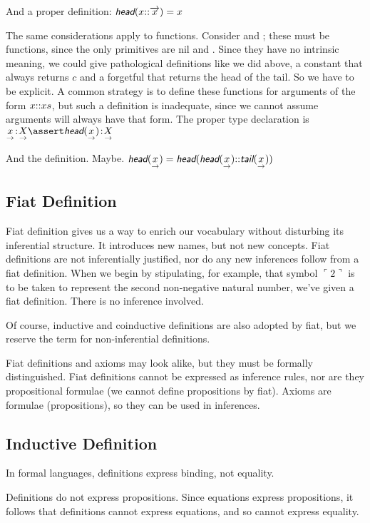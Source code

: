 \documentclass{article}
\begin{document}
And a proper definition: \(\head(x\cons\coseq{x}) = x\)

The same considerations apply to functions. Consider \head{} and
\tail{}; these must be functions, since the only primitives are nil
and \Cons. Since they have no intrinsic meaning, we could give
pathological definitions like we did above, a constant \head{} that
always returns \(c\) and a forgetful \head{} that returns the head of
the tail. So we have to be explicit. A common strategy is to define
these functions for arguments of the form \(x{\mathpunct{::}} xs\), but such a
definition is inadequate, since we cannot assume arguments will always
have that form. The proper type declaration is
\(\tj{\seq{x}}{\List{X}} \linfer \tj{\head(\seq{x})}{\List{X}}\)

And the definition. Maybe.
\(\head(\seq{x}) = \head(\head(\seq{x})\cons\tail(\seq{x}))\)

\subsection{Fiat Definition}

Fiat definition gives us a way to enrich our vocabulary without
disturbing its inferential structure. It introduces new names, but not
new concepts. Fiat definitions are not inferentially justified, nor do
any new inferences follow from a fiat definition. When we begin by
stipulating, for example, that symbol \(\ulcorner 2\urcorner\) is to
be taken to represent the second non-negative natural number, we've
given a fiat definition. There is no inference involved.

Of course, inductive and coinductive definitions are also adopted by
fiat, but we reserve the term for non-inferential definitions.

Fiat definitions and axioms may look alike, but they must be formally
distinguished. Fiat definitions cannot be expressed as inference
rules, nor are they propositional formulae (we cannot define
propositions by fiat). Axioms are formulae (propositions), so they can
be used in inferences.

\subsection{Inductive Definition}

In formal languages, definitions express binding, not equality.

Definitions do not express propositions. Since equations express
propositions, it follows that definitions cannot express equations,
and so cannot express equality.
\end{document}
